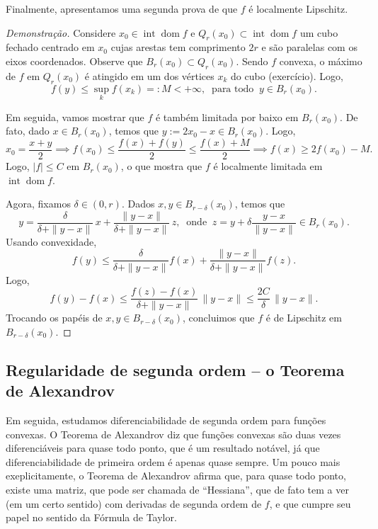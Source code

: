 Finalmente, apresentamos uma segunda prova de que $f$ é localmente Lipschitz.

\begin{proof}[Demonstração]
	Considere $x_0 \in \operatorname{int} \operatorname{dom} f$ e $Q_r(x_0) \subset \operatorname{int} \operatorname{dom} f$ um cubo fechado centrado em $x_0$ cujas arestas tem comprimento $2r$ e são paralelas com os eixos coordenados. Observe que $B_r(x_0) \subset Q_r(x_0)$. Sendo $f$ convexa, o máximo de $f$ em $Q_r(x_0)$ é atingido em um dos vértices $x_k$ do cubo (exercício). Logo,
	\[
	f(y) \le \sup_k f(x_k) =:M < + \infty, \ \text{ para todo } \ y \in B_r(x_0).
	\]
	
	Em seguida, vamos mostrar que $f$ é também limitada por baixo em $B_{r} (x_0)$. De fato, dado $x \in B_{r} (x_0)$, temos que $y := 2x_0 - x \in B_r(x_0)$. Logo,
	\[
	x_0 = \frac{x + y}{2} \implies f(x_0) \le \frac{f(x) + f(y)}{2} \le \frac{f(x) + M}{2} \implies f(x) \ge 2 f(x_0) - M.
	\] Logo, $|f| \le C$ em $B_r(x_0)$, o que mostra que $f$ é localmente limitada em $\operatorname{int} \operatorname{dom} f$.
	
	Agora, fixamos $\delta \in (0,r)$. Dados $x, y \in B_{r - \delta}(x_0)$, temos que
	\[
	y = \frac{\delta}{\delta + \|y-x\|} \, x + \frac{\|y-x\|}{\delta + \|y-x\|} \, z, \ \text{ onde } \ z = y + \delta \frac{y-x}{\|y-x\|} \in B_r(x_0).
	\] Usando convexidade,
	\[
	f(y) \le \frac{\delta}{\delta + \|y-x\|}  f(x) + \frac{\|y-x\|}{\delta + \|y-x\|} f(z).
	\] Logo,
	\[
	f(y) - f(x) \le \frac{f(z) - f(x)}{\delta + \|y-x\|} \,  \|y-x\| \le \frac{2C}{\delta} \,  \|y-x\|.
	\] Trocando os papéis de $x,y \in B_{r - \delta}(x_0)$, concluimos que $f$ é de Lipschitz em $B_{r - \delta}(x_0)$.
\end{proof}

\subsection{Regularidade de segunda ordem -- o Teorema de Alexandrov}


Em seguida, estudamos diferenciabilidade de segunda ordem para funções convexas. O Teorema de Alexandrov diz que funções convexas são duas vezes diferenciáveis para quase todo ponto, que é um resultado notável, já que diferenciabilidade de primeira ordem é apenas quase sempre. Um pouco mais exeplicitamente, o Teorema de Alexandrov afirma que, para quase todo ponto, existe uma matriz, que pode ser chamada de ``Hessiana'', que de fato tem a ver (em um certo sentido) com derivadas de segunda ordem de $f$, e que cumpre seu papel no sentido da Fórmula de Taylor.

